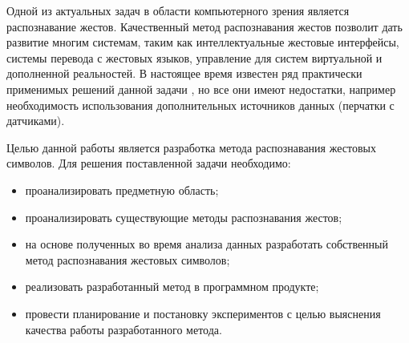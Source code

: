 \Introduction

Одной из актуальных задач в области компьютерного зрения является распознавание жестов. Качественный метод распознавания жестов позволит дать развитие многим системам, таким как интеллектуальные жестовые интерфейсы, системы перевода с жестовых языков, управление для систем виртуальной и дополненной реальностей. В настоящее время известен ряд практически применимых решений данной задачи \cite{Suharjito}, но все они имеют недостатки, например необходимость использования дополнительных источников данных (перчатки с датчиками).

Целью данной работы является разработка метода распознавания жестовых символов. Для решения поставленной задачи необходимо:

\begin{itemize}
	\item проанализировать предметную область;
	\item проанализировать существующие методы распознавания жестов;
	\item на основе полученных во время анализа данных разработать собственный метод распознавания жестовых символов;
	\item реализовать разработанный метод в программном продукте;
	\item провести планирование и постановку экспериментов с целью выяснения качества работы разработанного метода.
\end{itemize}